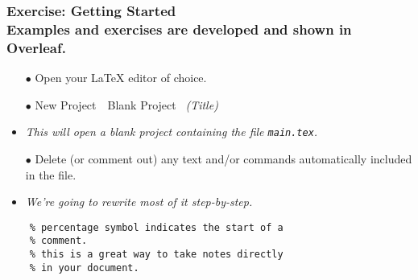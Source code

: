 
\begin{frame}[fragile]
\frametitle{Exercise: Getting Started \\
{\small Examples and exercises are developed and shown in Overleaf.}} 
\begin{itemize}
    \item[$\bullet$] Open your \LaTeX{} editor of choice.
    \item[$\bullet$] New Project~\rightarrow~Blank Project \rightarrow~\textit{(Title)} 
    \item {\small \textit{This will open a blank project containing the file \texttt{main.tex}.}} 
    \item[$\bullet$] Delete (or comment out) any text and/or commands automatically included in the file.
    \item {\small \textit{We're going to rewrite most of it step-by-step.}} 
\end{itemize}
\begin{alertblock}{}
    \begin{verbatim}
    % percentage symbol indicates the start of a  
    % comment.
    % this is a great way to take notes directly 
    % in your document.
    \end{verbatim}
\end{alertblock}

\end{frame}
